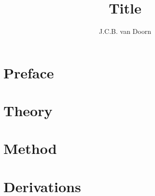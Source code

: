 \documentclass[draft,twoside,single]{lion-msc}
\title{Title}
\author{J.C.B. van Doorn}
\begin{document}
	\maketitle

	\tableofcontents

	\chapter{Preface}
	

	\chapter{Theory}
	

	\chapter{Method}
	

	\appendix
	\chapter{Derivations}
	

	\printbibliography
\end{document}
